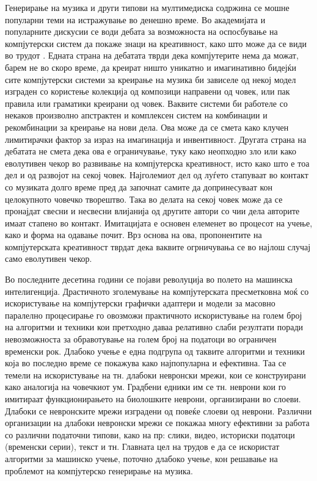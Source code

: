 Генерирање на музика и други типови на мултимедиска содржина се мошне популарни теми на истражување во денешно време. Во академијата и популарните дискусии се води дебата за возможноста на оспосбување на компјутерски систем да покаже знаци на креативност, како што може да се види во трудот \cite{Ghedini2015}. Едната страна на дебатата тврди дека компјутерите нема да можат, барем не во скоро време, да креират ништо уникатно и имагинативно бидејќи сите компјутерски системи за креирање на музика би зависеле од некој модел изграден со користење колекција од композици направени од човек, или пак правила или граматики креирани од човек. Ваквите системи би работеле со некаков произволно апстрактен и комплексен систем на комбинации и рекомбинации за креирање на нови дела. Ова може да се смета како клучен лимитирачки фактор за израз на имагинација и инвентивност. Другата страна на дебатата не смета дека ова е ограничување, туку како неопходно зло или како еволутивен чекор во развивање на компјутерска креативност, исто како што е тоа дел и од развојот на секој човек. Најголемиот дел од луѓето стапуваат во контакт со музиката долго време пред да започнат самите да допринесуваат кон целокупното човечко творештво. Така во делата на секој човек може да се пронајдат свесни и несвесни влијанија од другите автори со чии дела авторите имаат стапено во контакт. Имитацијата е основен елеменет во процесот на учење, како и форма на одавање почит. Врз основа на ова, пропонентите на компјутерската креативност тврдат дека ваквите огрничувања се во најлош случај само еволутивен чекор.

Во последните десетина години се појави револуција во полето на машинска интелигенција. Драстичното зголемување на компјутерската пресметковна моќ со искористување на компјутерски графички адаптери и модели за масовно паралелно процесирање го овозможи практичното искористување на голем број на алгоритми и техники кои претходно даваа релативно слаби резултати поради невозможноста за обравотување на голем број на податоци во ограничен временски рок. Длабоко учење е една подгрупа од таквите алгоритми и техники која во последно време се покажува како најпопуларна и ефективна. Таа се темели на искористување на тн. длабоки невронски мрежи, кои се конструирани како аналогија на човечкиот ум. Градбени едники им се тн. неврони кои го имитираат функционирањето на биолошките неврони, организирани во слоеви. Длабоки се невронските мрежи изградени од повеќе слоеви од неврони. Различни организации на длабоки невронски мрежи се покажаа многу ефективни за работа со различни податочни типови, како на пр: слики, видео, историски податоци (временски серии), текст и тн. Главната цел на трудов е да се искористат алгоритми за машинско учење, поточно длабоко учење, кон решавање на проблемот на компјутерско генерирање на музика.

